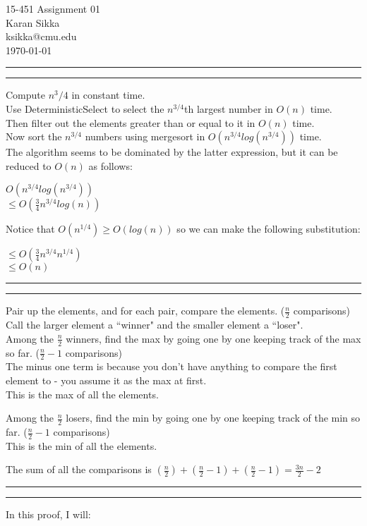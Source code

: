 \documentclass[11pt,letterpaper]{article}
\makeatletter
\newcommand{\question}[1] {\vspace{.25in} \hrule\vspace{0.5em}
\noindent{\bf #1} \vspace{0.5em}
\hrule \vspace{.10in}}
\newcommand{\myname}{Karan Sikka}
\newcommand{\myandrew}{ksikka@cmu.edu}
\newcommand{\myhwnum}{01}
\makeatother
\begin{document}
\medskip

\thispagestyle{plain}
\begin{center}                  %
{\Large 15-451 Assignment \myhwnum} \\
\myname \\
\myandrew \\
\today
\end{center}

\question{1a.}
Compute $n^3/4$ in constant time.\\
Use DeterministicSelect to select the $n^{3/4}$th largest number in $O(n)$ time.\\
Then filter out the elements greater than or equal to it in $O(n)$ time.\\
Now sort the $n^{3/4}$ numbers using mergesort in $O(n^{3/4}log(n^{3/4}))$ time.\\
The algorithm seems to be dominated by the latter expression, but it can be reduced to $O(n)$ as follows:

     $O(n^{3/4}log(n^{3/4}))$ \\
$\leq O(\frac{3}{4} n^{3/4} log(n))$

Notice that $O(n^{1/4}) \geq O(log(n))$ so we can make the following substitution:

$\leq O(\frac{3}{4} n^{3/4} n^{1/4})$ \\
$\leq O(n)$

\question{1b.}
Pair up the elements, and for each pair, compare the elements. ($\frac{n}{2}$ comparisons) \\
Call the larger element a ``winner" and the smaller element a ``loser". \\
Among the $\frac{n}{2}$ winners, find the max by going one by one keeping track of the max so far. ($\frac{n}{2}-1$ comparisons) \\
The minus one term is because you don't have anything to compare the first element to - you assume it as the max at first. \\
This is the max of all the elements.

Among the $\frac{n}{2}$ losers, find the min by going one by one keeping track of the min so far. ($\frac{n}{2}-1$ comparisons) \\
This is the min of all the elements.

The sum of all the comparisons is $(\frac{n}{2}) + (\frac{n}{2}-1) + (\frac{n}{2}-1) = \frac{3n}{2}-2 $

\question{1c.}
In this proof, I will:
\end{document}
